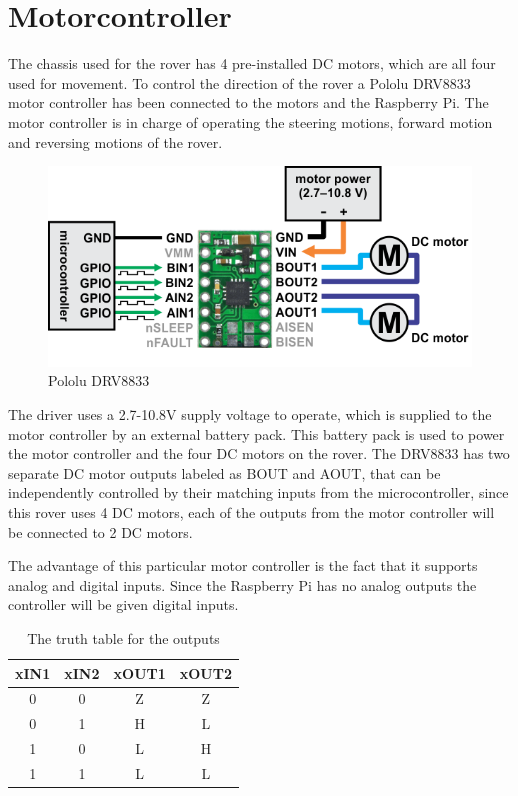 \clearpage
\section{Motorcontroller}

The chassis used for the rover has 4 pre-installed DC motors, which are all four used for movement. To control the direction of the rover a Pololu DRV8833 motor controller has been connected to the motors and the Raspberry Pi. The motor controller is in charge of operating the steering motions, forward motion and reversing motions of the rover.

\begin{figure}[H]
	\centering
	\includegraphics[width=.8\linewidth]{images/DRV8833.png}
	\caption{Pololu DRV8833\cite{DRV8833pic}}
\end{figure}

The driver uses a 2.7-10.8V supply voltage to operate, which is supplied to the motor controller by an external battery pack. This battery pack is used to power the motor controller and the four DC motors on the rover. The DRV8833 has two separate DC motor outputs labeled as BOUT and AOUT, that can be independently controlled by their matching inputs from the microcontroller, since this rover uses 4 DC motors, each of the outputs from the motor controller will be connected to 2 DC motors.

The advantage of this particular motor controller is the fact that it supports analog and digital inputs. Since the Raspberry Pi has no analog outputs the controller will be given digital inputs. 

\begin{table}[H]
\centering
\begin{tabular}{|c|c|c|c|}
\hline
xIN1 & xIN2 & xOUT1 & xOUT2 \\ \hline
0    & 0    & Z     & Z     \\ \hline
0    & 1    & H     & L     \\ \hline
1    & 0    & L     & H     \\ \hline
1    & 1    & L     & L     \\ \hline
\end{tabular}
\caption{The truth table for the outputs}
\label{motorcontrollertruthtabel}
\end{table}

